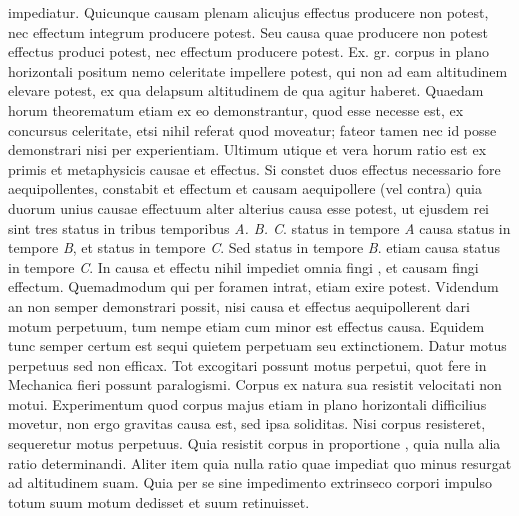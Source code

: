 impediatur. Quicunque causam plenam alicujus effectus producere non potest, nec effectum integrum producere potest. Seu causa quae producere non potest  effectus produci potest, nec effectum producere potest. Ex. gr. corpus in plano horizontali positum nemo celeritate impellere potest, qui non ad eam altitudinem elevare potest, ex qua delapsum altitudinem de qua agitur haberet. 
\pend 
\count{}
\count{}
\pstart 
Quaedam horum theorematum\protect{} etiam ex eo demonstrantur, quod  esse necesse est, ex concursus celeritate, etsi nihil referat quod moveatur; fateor tamen nec id posse demonstrari nisi per experientiam\protect{}. Ultimum utique et vera horum ratio est ex primis et metaphysicis causae et effectus. Si constet  duos effectus necessario fore aequipollentes, constabit et effectum et causam aequipollere (vel contra) quia duorum unius causae effectuum alter alterius causa esse potest, ut ejusdem rei sint tres status in tribus temporibus \textit{A. B. C}. status in tempore \textit{A} causa status in tempore \textit{B}, et status in tempore \textit{C}. Sed status in tempore \textit{B}. etiam causa status in tempore \textit{C}. In causa et effectu nihil impediet omnia fingi , et causam fingi effectum. Quemadmodum qui per foramen intrat, etiam exire potest. Videndum an non semper demonstrari possit, nisi causa et effectus aequipollerent dari motum perpetuum\protect{}, tum nempe etiam cum minor est effectus causa. Equidem tunc semper certum est sequi quietem perpetuam seu extinctionem. Datur motus perpetuus\protect{} sed non efficax. \pend \pstart Tot excogitari possunt motus perpetui, quot fere in Mechanica\protect{} fieri possunt paralogismi. Corpus ex natura sua resistit velocitati non motui. Experimentum\protect{} quod corpus majus etiam in plano horizontali difficilius movetur, non ergo gravitas causa est, sed ipsa soliditas. Nisi corpus resisteret, sequeretur motus perpetuus\protect{}. Quia resistit corpus in proportione , quia nulla alia ratio determinandi. Aliter item quia nulla ratio quae impediat quo minus resurgat ad altitudinem suam. Quia per se sine impedimento extrinseco corpori impulso totum suum motum dedisset et suum retinuisset. \pend
\count{}
\count{}


